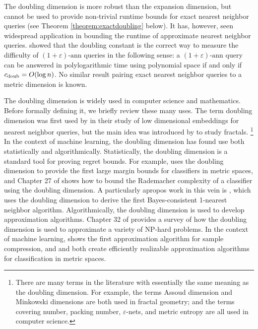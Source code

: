 \documentclass[thesis.tex]{subfiles}
\newcommand{\cdoub}{c_\textnormal{doub}}
\newcommand{\eann}{(1+\varepsilon)\text{-ann}}
\begin{document}
The doubling dimension is more robust than the expansion dimension,
but cannot be used to provide non-trivial runtime bounds for exact nearest neighbor queries (see Theorem \ref{theorem:exactdoubling} below).
It has, however, seen widespread application in bounding the runtime of approximate nearest neighbor queries.
\cite{krauthgamer2005black} showed that the doubling constant is the correct way to measure the difficulty of $\eann$ queries in the following sense:
a $\eann$ query can be answered in polylogarithmic time using polynomial space if and only if $\cdoub = O(\log n)$.
No similar result pairing exact nearest neighbor queries to a metric dimension is known.

The doubling dimension is widely used in computer science and mathematics.
Before formally defining it, we briefly review these many uses. 
The term doubling dimension was first used by \citet{gupta2003bounded} in their study of low dimensional embeddings for nearest neighbor queries,
but the main idea was introduced by \citet{assoud1979etude} to study fractals.%
\footnote{
    There are many terms in the literature with essentially the same meaning as the doubling dimension.
    For example, the terms Assoud dimension and Minkowski dimensions are both used in fractal geometry;
    and the terms covering number, packing number, $\varepsilon$-nets, and metric entropy are all used in computer science. 
}
In the context of machine learning, the doubling dimension has found use both statistically and algorithmically.
Statistically, the doubling dimension is a standard tool for proving regret bounds.
For example, \citet{luxburg2004distance} uses the doubling dimension to provide the first large margin bounds for classifiers in metric spaces,
and Chapter 27 of \cite{shalev2014understanding} shows how to bound the Rademacher complexity of a classifier using the doubling dimension.
A particularly apropos work in this vein is \citet{kontorovich2015bayes},
which uses the doubling dimension to derive the first Bayes-consistent 1-nearest neighbor algorithm.
Algorithmically, the doubling dimension is used to develop approximation algorithms.
Chapter 32 of \cite{toth2017handbook} provides a survey of how the doubling dimension is used to approximate a variety of NP-hard problems.
In the context of machine learning, \citet{gottlieb2014near} shows the first approximation algorithm for sample compression,
and
\citet{gottlieb2014efficient} and \citet{gottlieb2017efficient} both create efficiently realizable approximation algorithms for classification in metric spaces.
\end{document}
